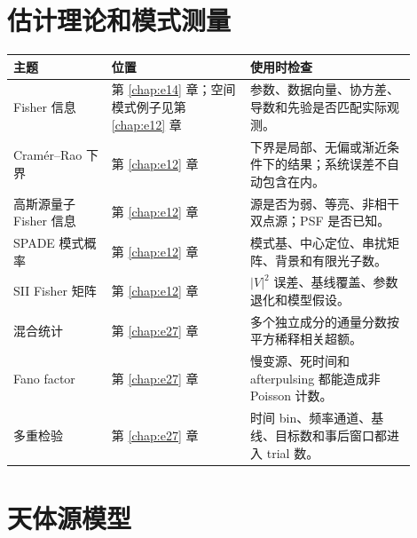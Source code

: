 \section{估计理论和模式测量}
\label{appsec:a-estimation}

\begin{longtable}{p{0.22\linewidth}p{0.31\linewidth}p{0.37\linewidth}}
\toprule
主题 & 位置 & 使用时检查 \\
\midrule
Fisher 信息 & 第 \ref{chap:e14} 章；空间模式例子见第 \ref{chap:e12} 章 & 参数、数据向量、协方差、导数和先验是否匹配实际观测。 \\
Cramér--Rao 下界 & 第 \ref{chap:e12} 章 & 下界是局部、无偏或渐近条件下的结果；系统误差不自动包含在内。 \\
高斯源量子 Fisher 信息 & 第 \ref{chap:e12} 章 & 源是否为弱、等亮、非相干双点源；PSF 是否已知。 \\
SPADE 模式概率 & 第 \ref{chap:e12} 章 & 模式基、中心定位、串扰矩阵、背景和有限光子数。 \\
SII Fisher 矩阵 & 第 \ref{chap:e12} 章 & \(|V|^2\) 误差、基线覆盖、参数退化和模型假设。 \\
混合统计 & 第 \ref{chap:e27} 章 & 多个独立成分的通量分数按平方稀释相关超额。 \\
Fano factor & 第 \ref{chap:e27} 章 & 慢变源、死时间和 afterpulsing 都能造成非 Poisson 计数。 \\
多重检验 & 第 \ref{chap:e27} 章 & 时间 bin、频率通道、基线、目标数和事后窗口都进入 trial 数。 \\
\bottomrule
\end{longtable}

\section{天体源模型}
\label{appsec:a-sources}

